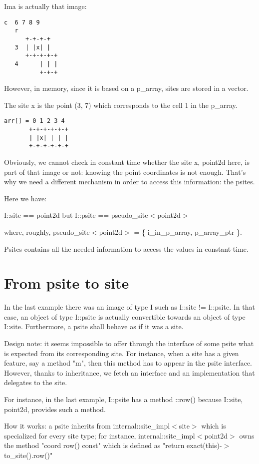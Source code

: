 \documentclass{report}
\begin{document}
Ima is actually that image:
\begin{lstlisting}[frame=single]
    c  6 7 8 9
   r
      +-+-+-+
   3  | |x| |
      +-+-+-+-+
   4      | | |
          +-+-+
\end{lstlisting}

However, in memory, since it is based on a p\_array, sites are stored in a
vector.

The site x is the point (3, 7) which corresponds to the cell 1 in the p\_array.

\begin{lstlisting}[frame=single]
arr[] = 0 1 2 3 4
       +-+-+-+-+-+
       | |x| | | |
       +-+-+-+-+-+
\end{lstlisting}

Obviously, we cannot check in constant time whether the site x, point2d here,
is part of that image or not: knowing the point coordinates is not enough.
That's why we need a different mechanism in order to access this information:
the psites.

Here we have:

  I::site == point2d  but  I::psite == pseudo\_site$<$point2d$>$

where, roughly, pseudo\_site$<$point2d$>$ = \{ i\_in\_p\_array, p\_array\_ptr
\}.

Psites contains all the needed information to access the values in
constant-time.

\section{From psite to site}

In the last example there was an image of type I such as I::site != I::psite. 
In that case, an object of type I::psite is actually convertible towards an
object of type I::site.  Furthermore, a psite shall behave as if it was a
site.

Design note: it seems impossible to offer through the interface of
some psite what is expected from its corresponding site.  For instance, when a
site has a given feature, say a method "m", then this
method has to appear in the psite interface. However, thanks to
inheritance, we fetch an interface and an implementation that delegates
to the site.

For instance, in the last example, I::psite has a method ::row() because
I::site, point2d, provides such a method.

How it works: a psite inherits from internal::site\_impl$<$site$>$ which is
specialized for every site type; for instance, internal::site\_impl$<$point2d$>$
owns the method "coord row() const" which is defined as
"return exact(this)-$>$to\_site().row()"
\end{document}
